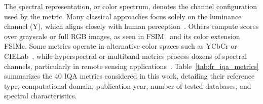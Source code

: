 The spectral representation, or color spectrum, denotes the channel configuration used by the metric. Many classical approaches focus solely on the luminance channel (Y), which aligns closely with human perception~\cite{sheikh_vif_2006, chandler2007vsnr}. Others compute scores over grayscale or full RGB images, as seen in FSIM~\cite{zhang2011fsim} and its color extension FSIMc. Some metrics operate in alternative color spaces such as YCbCr or CIELab~\cite{Wang2002PQM}, while hyperspectral or multiband metrics process dozens of spectral channels, particularly in remote sensing applications~\cite{Zhou1998SCC,Alparone2008QNR}. Table~\ref{tab:fr_iqa_metrics} summarizes the 40 IQA metrics considered in this work, detailing their reference type, computational domain, publication year, number of tested databases, and spectral characteristics.


